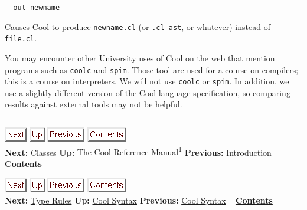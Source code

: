 \documentclass[]{article}
\begin{document}
\texttt{-{}-out newname}

Causes Cool to produce \texttt{newname.cl} (or \texttt{.cl-ast}, or
whatever) instead of \texttt{file.cl}.

You may encounter other University uses of Cool on the web that mention
programs such as \texttt{coolc} and \texttt{spim}. Those tool are used
for a course on compilers; this is a course on interpreters. We will not
use \texttt{coolc} or \texttt{spim}. In addition, we use a slightly
different version of the Cool language specification, so comparing
results against external tools may not be helpful.

\begin{center}\rule{3in}{0.4pt}\end{center}

\href{node4.html}{\includegraphics{next.png}}
\href{cool-manual.html}{\includegraphics{up.png}}
\href{node2.html}{\includegraphics{prev.png}}
\href{node1.html}{\includegraphics{contents.png}} \\ \textbf{Next:}
\href{node4.html}{Classes} \textbf{Up:} \href{cool-manual.html}{The Cool
Reference Manual\textsuperscript{1}} \textbf{Previous:}
\href{node2.html}{Introduction} ~ \textbf{\href{node1.html}{Contents}}

\href{node41.html}{\includegraphics{next.png}}
\href{node39.html}{\includegraphics{up.png}}
\href{node39.html}{\includegraphics{prev.png}}
\href{node1.html}{\includegraphics{contents.png}} \\ \textbf{Next:}
\href{node41.html}{Type Rules} \textbf{Up:} \href{node39.html}{Cool
Syntax} \textbf{Previous:} \href{node39.html}{Cool Syntax} ~
\textbf{\href{node1.html}{Contents}} \\ \\
\end{document}
